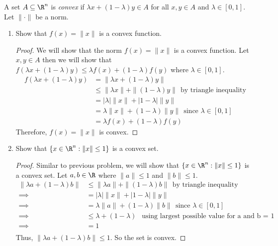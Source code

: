 \documentclass[shortlabels]{article}
\begin{document}
\begin{bprob}
    A set $A \subseteq \R^n$ is \emph{convex} if $\lambda x + (1-\lambda) y \in A$ for all $x,y\in A$ and $\lambda \in [0,1]$. Let $\| \cdot \|$ be a norm.
    \begin{enumerate}
        \item {} Show that $f(x) = \| x \|$ is a convex function.
        
        \begin{proof}
            We will show that the norm $f(x) = \| x \|$ is a convex function. Let $x,y  \in A$ then we will show that $f(\lambda x + (1-\lambda) y )\leq \lambda f(x) + (1-\lambda) f(y)$ where $\lambda \in [0,1]$.
            \begin{align*}
                f(\lambda x + (1-\lambda) y ) &= \| \lambda x + (1-\lambda) y \| \\
                &\leq \| \lambda x \| + \| (1-\lambda) y \| \ \ \text{by triangle inequality}\\
                &= |\lambda| \|x\| + | 1 - \lambda | \| y \|  \\
                &= \lambda \|x\| + (1 - \lambda) \| y \| \ \ \text{since }\lambda \in [0,1]\\ 
                &= \lambda f(x) + (1-\lambda) f(y)
            \end{align*}
        Therefore, $f(x) = \| x \|$ is convex.
        \end{proof}
        \newpage

        \item {} Show that $\{ x \in \R^n : \|x\| \leq 1\}$ is a convex set.

        \begin{proof}
            Similar to previous problem, we will show that $\{ x \in \R^n : \|x\| \leq 1\}$ is a convex set. Let $a,b \in \R$ where $\|a\| \leq 1$ and $\|b\| \leq 1$.
            \begin{align*}
                \| \lambda a + (1-\lambda) b \| 
                 &\leq \| \lambda a \| + \| (1-\lambda) b \| \ \ \text{by triangle inequality}\\
                \implies &= |\lambda| \|x\| + | 1 - \lambda | \| y \|  \\
                \implies &= \lambda \|a\| + (1 - \lambda) \| b \| \ \ \text{since }\lambda \in [0,1]\\
                \implies &\leq \lambda  + (1-\lambda)  \ \ \text{ using largest possible value for a and b = 1} \\
                \implies &= 1 \\
            \end{align*}
            Thus, $\| \lambda a + (1-\lambda) b \| \leq 1$. So the set is convex.
            \end{proof}
        

\end{enumerate}
\end{bprob}
\end{document}
